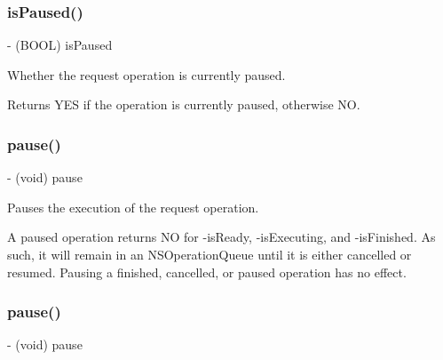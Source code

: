 \subsubsection{\texorpdfstring{is\+Paused()}{isPaused()}\hspace{0.1cm}{\footnotesize\ttfamily [3/3]}}
{\footnotesize\ttfamily -\/ (B\+O\+OL) is\+Paused \begin{DoxyParamCaption}{ }\end{DoxyParamCaption}}

Whether the request operation is currently paused.

\begin{DoxyReturn}{Returns}
{\ttfamily Y\+ES} if the operation is currently paused, otherwise {\ttfamily NO}. 
\end{DoxyReturn}
\mbox{\label{interface_a_f_u_r_l_connection_operation_a7f895d00bdf837f67b959a3bf1bc37a2}} 
\subsubsection{\texorpdfstring{pause()}{pause()}\hspace{0.1cm}{\footnotesize\ttfamily [1/3]}}
{\footnotesize\ttfamily -\/ (void) pause \begin{DoxyParamCaption}{ }\end{DoxyParamCaption}}

Pauses the execution of the request operation.

A paused operation returns {\ttfamily NO} for {\ttfamily -\/is\+Ready}, {\ttfamily -\/is\+Executing}, and {\ttfamily -\/is\+Finished}. As such, it will remain in an {\ttfamily N\+S\+Operation\+Queue} until it is either cancelled or resumed. Pausing a finished, cancelled, or paused operation has no effect. \mbox{\label{interface_a_f_u_r_l_connection_operation_a7f895d00bdf837f67b959a3bf1bc37a2}} 
\subsubsection{\texorpdfstring{pause()}{pause()}\hspace{0.1cm}{\footnotesize\ttfamily [2/3]}}
{\footnotesize\ttfamily -\/ (void) pause \begin{DoxyParamCaption}{ }\end{DoxyParamCaption}}

